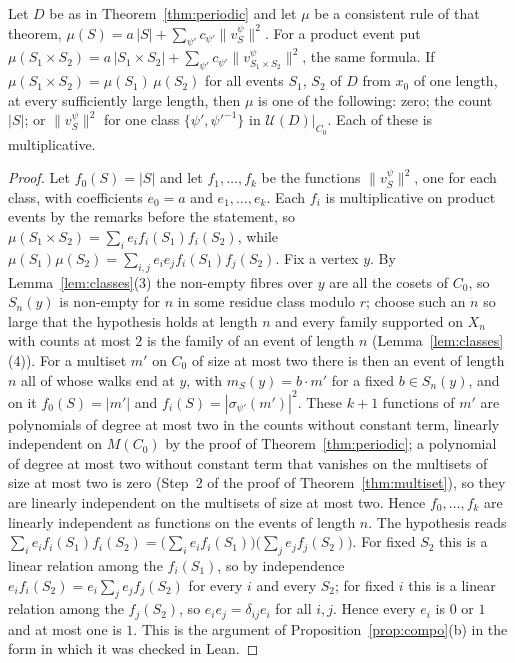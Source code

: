 \begin{corollary}[Composition]\label{cor:composition}
Let $D$ be as in Theorem~\ref{thm:periodic} and let $\mu$ be a consistent rule of that theorem, $\mu(S)=a\,|S|+\sum_{\psi'}c_{\psi'}\lVert v^\psi_S\rVert^2$. For a product event put $\mu(S_1\times S_2)=a\,|S_1\times S_2|+\sum_{\psi'}c_{\psi'}\lVert v^\psi_{S_1\times S_2}\rVert^2$, the same formula. If $\mu(S_1\times S_2)=\mu(S_1)\,\mu(S_2)$ for all events $S_1$, $S_2$ of $D$ from $x_0$ of one length, at every sufficiently large length, then $\mu$ is one of the following: zero; the count $|S|$; or $\lVert v^\psi_S\rVert^2$ for one class $\{\psi',\psi'^{-1}\}$ in $\mathcal{U}(D)|_{C_0}$. Each of these is multiplicative.
\end{corollary}
\begin{proof}
Let $f_0(S)=|S|$ and let $f_1,\dots,f_k$ be the functions $\lVert v^\psi_S\rVert^2$, one for each class, with coefficients $e_0=a$ and $e_1,\dots,e_k$. Each $f_i$ is multiplicative on product events by the remarks before the statement, so $\mu(S_1\times S_2)=\sum_ie_if_i(S_1)f_i(S_2)$, while $\mu(S_1)\mu(S_2)=\sum_{i,j}e_ie_jf_i(S_1)f_j(S_2)$. Fix a vertex $y$. By Lemma~\ref{lem:classes}(3) the non-empty fibres over $y$ are all the cosets of $C_0$, so $S_n(y)$ is non-empty for $n$ in some residue class modulo $r$; choose such an $n$ so large that the hypothesis holds at length $n$ and every family supported on $X_n$ with counts at most $2$ is the family of an event of length $n$ (Lemma~\ref{lem:classes}(4)). For a multiset $m'$ on $C_0$ of size at most two there is then an event of length $n$ all of whose walks end at $y$, with $m_S(y)=b\cdot m'$ for a fixed $b\in S_n(y)$, and on it $f_0(S)=|m'|$ and $f_i(S)=|\sigma_{\psi'}(m')|^2$. These $k+1$ functions of $m'$ are polynomials of degree at most two in the counts without constant term, linearly independent on $M(C_0)$ by the proof of Theorem~\ref{thm:periodic}; a polynomial of degree at most two without constant term that vanishes on the multisets of size at most two is zero (Step~2 of the proof of Theorem~\ref{thm:multiset}), so they are linearly independent on the multisets of size at most two. Hence $f_0,\dots,f_k$ are linearly independent as functions on the events of length $n$. The hypothesis reads $\sum_ie_if_i(S_1)f_i(S_2)=\bigl(\sum_ie_if_i(S_1)\bigr)\bigl(\sum_je_jf_j(S_2)\bigr)$. For fixed $S_2$ this is a linear relation among the $f_i(S_1)$, so by independence $e_if_i(S_2)=e_i\sum_je_jf_j(S_2)$ for every $i$ and every $S_2$; for fixed $i$ this is a linear relation among the $f_j(S_2)$, so $e_ie_j=\delta_{ij}e_i$ for all $i,j$. Hence every $e_i$ is $0$ or $1$ and at most one is $1$. This is the argument of Proposition~\ref{prop:compo}(b) in the form in which it was checked in Lean.
\end{proof}

